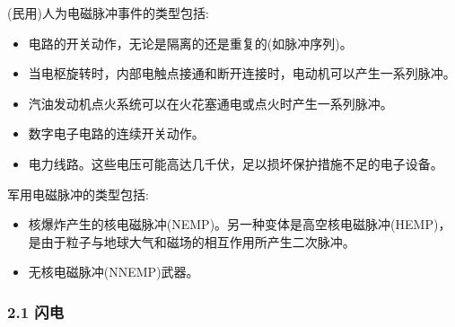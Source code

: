 (民用)人为电磁脉冲事件的类型包括:
\begin{itemize}
\item 电路的开关动作，无论是隔离的还是重复的(如脉冲序列)。
\item 当电枢旋转时，内部电触点接通和断开连接时，电动机可以产生一系列脉冲。
\item 汽油发动机点火系统可以在火花塞通电或点火时产生一系列脉冲。
\item 数字电子电路的连续开关动作。
\item 电力线路。这些电压可能高达几千伏，足以损坏保护措施不足的电子设备。
\end{itemize}

军用电磁脉冲的类型包括:
\begin{itemize}
\item 核爆炸产生的核电磁脉冲(NEMP)。另一种变体是高空核电磁脉冲(HEMP)，是由于粒子与地球大气和磁场的相互作用所产生二次脉冲。
\item 无核电磁脉冲(NNEMP)武器。
\end{itemize}
\subsubsection{2.1 闪电}
